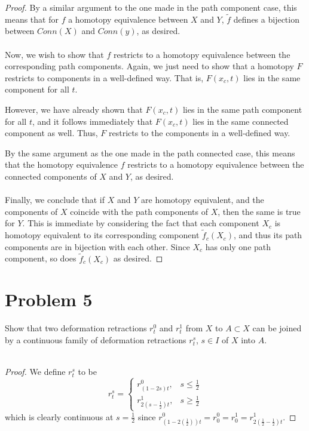 \documentclass[fontsize=11pt]{scrartcl} %
\numberwithin{equation}{section} %
\numberwithin{figure}{section} %
\numberwithin{table}{section} %
\begin{document}
\begin{proof}
    By a similar argument to the one made in the path component case, this means
    that for $f$ a homotopy equivalence between $X$ and $Y$, $\tilde{f}$ defines
    a bijection between $Conn(X)$ and $Conn(y)$, as desired.
    \\
    \\
    Now, we wish to show that $f$ restricts to a homotopy equivalence between
    the corresponding path components. Again, we just need to show that a
    homotopy $F$ restricts to components in a well-defined way. That is,
    $F(x_c,t)$ lies in the same component for all $t$.

    However, we have already shown that $F(x_c,t)$ lies in the same path
    component for all $t$, and it follows immediately that $F(x_c,t)$ lies in
    the same connected component as well. Thus, $F$ restricts to the components
    in a well-defined way.

    By the same argument as the one made in the path connected case, this means
    that the homotopy equivalence $f$ restricts to a homotopy equivalence
    between the connected components of $X$ and $Y$, as desired.
    \\
    \\
    Finally, we conclude that if $X$ and $Y$ are homotopy equivalent, and the
    components of $X$ coincide with the path components of $X$, then the same is
    true for $Y$. This is immediate by considering the fact that each component
    $X_c$ is homotopy equivalent to its corresponding component
    $\tilde{f}_c(X_c)$, and thus its path components are in bijection with each
    other. Since $X_c$ has only one path component, so does $\tilde{f}_c(X_c)$
    as desired.
\end{proof}

\newpage

\section*{Problem 5}
Show that two deformation retractions $r^0_t$ and $r^1_t$ from $X$ to $A\subset
X$ can be joined by a continuous family of deformation retractions $r^s_t$,
$s\in I$ of $X$ into $A$.
\\
\\
\begin{proof}
    We define $r_t^s$ to be
    \[
        r^s_t = 
        \begin{cases}
            r^0_{(1-2s)t}, &s\leq \frac{1}{2}\\
            r^1_{2(s-\frac{1}{2})t}, &s\geq \frac{1}{2}
        \end{cases}
    \]
    which is clearly continuous at $s=\frac{1}{2}$ since
    $r^0_{(1-2(\frac{1}{2}))t} = r^0_0 = r^1_0 =
    r^1_{2(\frac{1}{2}-\frac{1}{2})t}$.
\end{proof}
\end{document}
